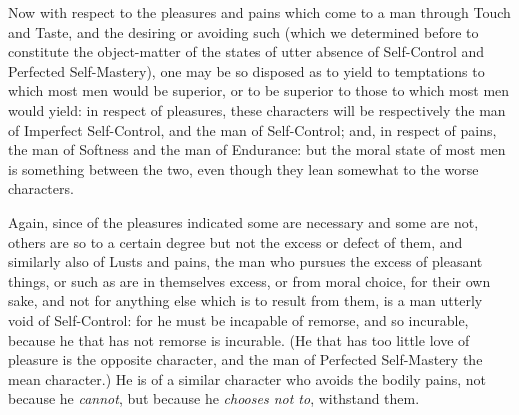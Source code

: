 
Now with respect to the pleasures and pains which come to a man through Touch
and Taste, and the desiring or avoiding such (which we determined before to
constitute the object-matter of the states of utter absence of Self-Control and
Perfected Self-Mastery), one may be so disposed as to yield to temptations to
which most men would be superior, or to be superior to those to which most men
would yield: in respect of pleasures, these characters will be respectively the
man of Imperfect Self-Control, and the man of Self-Control; and, in respect of
pains, the man of Softness and the man of Endurance: but the moral state of
most men is something between the two, even though they lean somewhat to the
worse characters.

Again, since of the pleasures indicated some are necessary and some are not,
others are so to a certain degree but not the excess or defect of them, and
similarly also of Lusts and pains, the man who pursues the excess of pleasant
things, or such as are in themselves excess, or from moral choice, for their
own sake, and not for anything else which is to result from them, is a man
utterly void of Self-Control: for he must be incapable of remorse, and so
incurable, because he that has not remorse is incurable. (He that has too
little love of pleasure is the opposite character, and the man of Perfected
Self-Mastery the mean character.) He is of a similar character who avoids the
bodily pains, not because he \emph{cannot}, but because he \emph{chooses not
to}, withstand them.

